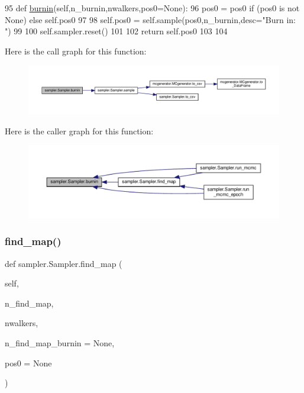 \begin{DoxyCode}
95     \textcolor{keyword}{def }\hyperlink{classsampler_1_1Sampler_a0520c9a624d5abc9edd3e379d1b66021}{burnin}(self,n\_burnin,nwalkers,pos0=None):
96         pos0 = pos0 \textcolor{keywordflow}{if} (pos0 \textcolor{keywordflow}{is} \textcolor{keywordflow}{not} \textcolor{keywordtype}{None}) \textcolor{keywordflow}{else} self.pos0
97         
98         self.pos0 = self.sample(pos0,n\_burnin,desc=\textcolor{stringliteral}{"Burn in: "})
99         
100         self.sampler.reset()
101         
102         \textcolor{keywordflow}{return} self.pos0
103     
104     
\end{DoxyCode}
Here is the call graph for this function\+:\nopagebreak
\begin{figure}[H]
\begin{center}
\leavevmode
\includegraphics[width=350pt]{d3/d8a/classsampler_1_1Sampler_a0520c9a624d5abc9edd3e379d1b66021_cgraph}
\end{center}
\end{figure}
Here is the caller graph for this function\+:\nopagebreak
\begin{figure}[H]
\begin{center}
\leavevmode
\includegraphics[width=350pt]{d3/d8a/classsampler_1_1Sampler_a0520c9a624d5abc9edd3e379d1b66021_icgraph}
\end{center}
\end{figure}
\mbox{\label{classsampler_1_1Sampler_ad7ddd812810028fad49c18ba7270f23f}} 
\subsubsection{\texorpdfstring{find\+\_\+map()}{find\_map()}}
{\footnotesize\ttfamily def sampler.\+Sampler.\+find\+\_\+map (\begin{DoxyParamCaption}\item[{}]{self,  }\item[{}]{n\+\_\+find\+\_\+map,  }\item[{}]{nwalkers,  }\item[{}]{n\+\_\+find\+\_\+map\+\_\+burnin = {\ttfamily None},  }\item[{}]{pos0 = {\ttfamily None} }\end{DoxyParamCaption})}



